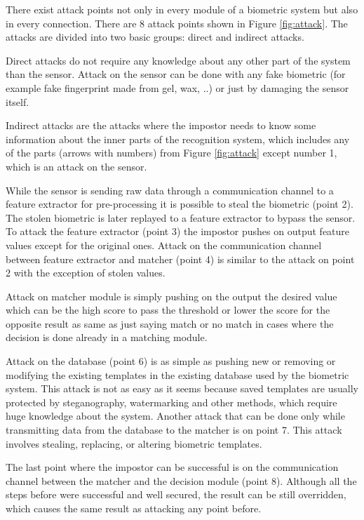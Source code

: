 There exist attack points not only in every module of a biometric system but also in every connection. There are 8 attack points shown in Figure \ref{fig:attack}. The attacks are divided into two basic groups: direct and indirect attacks. \cite{hack_2} \cite{jain2015attacks}

Direct attacks do not require any knowledge about any other part of the system than the sensor. Attack on the sensor can be done with any fake biometric (for example fake fingerprint made from gel, wax, ..) or just by damaging the sensor itself. \cite{jain2015attacks}

Indirect attacks are the attacks where the impostor needs to know some information about the inner parts of the recognition system, which includes any of the parts (arrows with numbers) from Figure \ref{fig:attack} except number 1, which is an attack on the sensor. \cite{jain2015attacks} \cite{hack_3}

While the sensor is sending raw data through a communication channel to a feature extractor for pre-processing it is possible to steal the biometric (point 2). The stolen biometric is later replayed to a feature extractor to bypass the sensor. To attack the feature extractor (point 3) the impostor pushes on output feature values except for the original ones. Attack on the communication channel between feature extractor and matcher (point 4) is similar to the attack on point 2 with the exception of stolen values. \cite{attack2} \cite{jain2015attacks}

Attack on matcher module is simply pushing on the output the desired value which can be the high score to pass the threshold or lower the score for the opposite result as same as just saying match or no match in cases where the decision is done already in a matching module. \cite{attack2} \cite{jain2015attacks}

Attack on the database (point 6) is as simple as pushing new or removing or modifying the existing templates in the existing database used by the biometric system. This attack is not as easy as it seems because saved templates are usually protected by steganography, watermarking and other methods, which require huge knowledge about the system. Another attack that can be done only while transmitting data from the database to the matcher is on point 7. This attack involves stealing, replacing, or altering biometric templates. \cite{mwema2015simple} \cite{jain2015attacks}

The last point where the impostor can be successful is on the communication channel between the matcher and the decision module (point 8). Although all the steps before were successful and well secured, the result can be still overridden, which causes the same result as attacking any point before. \cite{jain2015attacks} \cite{hack_3}


